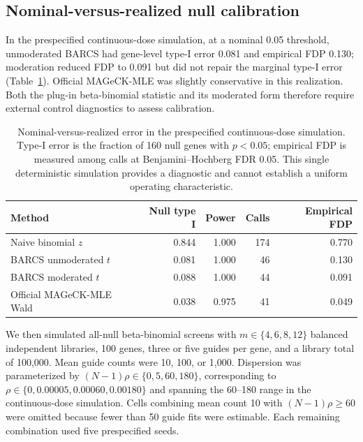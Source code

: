 \subsection{Nominal-versus-realized null calibration}
\label{sec:supp-calibration}

In the prespecified continuous-dose simulation, at a nominal 0.05 threshold,
unmoderated BARCS had gene-level type-I error 0.081 and empirical FDP 0.130;
moderation reduced FDP to 0.091 but did not repair the marginal type-I error
(Table~\ref{tab:calibration-diagnostic}).  Official MAGeCK-MLE was slightly
conservative in this realization.  Both the plug-in beta-binomial statistic
and its moderated form therefore require external control diagnostics to
assess calibration.

\begin{table}[htbp]
\centering
\caption{Nominal-versus-realized error in the prespecified continuous-dose
simulation.  Type-I error is the fraction of 160 null genes with $p<0.05$;
empirical FDP is measured among calls at Benjamini--Hochberg FDR 0.05.  This single deterministic simulation provides a diagnostic and cannot
establish a uniform operating characteristic.}
\label{tab:calibration-diagnostic}
\small
\begin{tabular}{lrrrr}
\toprule
Method & Null type I & Power & Calls & Empirical FDP\\
\midrule
Naive binomial $z$ & 0.844 & 1.000 & 174 & 0.770\\
BARCS unmoderated $t$ & 0.081 & 1.000 & 46 & 0.130\\
BARCS moderated $t$ & 0.088 & 1.000 & 44 & 0.091\\
Official MAGeCK-MLE Wald & 0.038 & 0.975 & 41 & 0.049\\
\bottomrule
\end{tabular}
\end{table}

We then simulated all-null beta-binomial screens with $m\in\{4,6,8,12\}$
balanced independent libraries, 100 genes, three or five guides per gene, and
a library total of 100,000.  Mean guide counts were 10, 100, or 1,000.
Dispersion was parameterized by $(N-1)\rho\in\{0,5,60,180\}$, corresponding to
$\rho\in\{0,0.00005,0.00060,0.00180\}$ and spanning the 60--180 range in the
continuous-dose simulation.  Cells combining mean count 10 with
$(N-1)\rho\geq60$ were omitted because fewer than 50 guide fits were
estimable.  Each remaining combination used five prespecified seeds.

